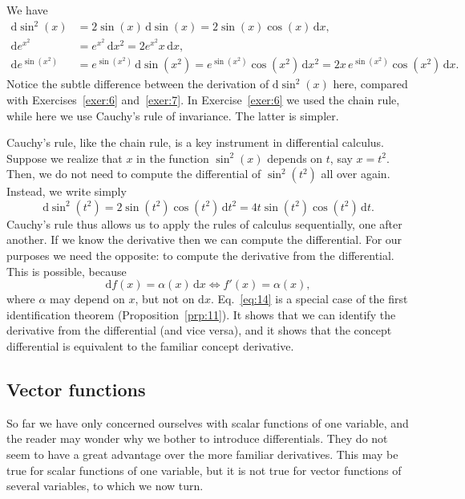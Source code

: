 \documentclass[12pt,a4paper]{article}
\makeatletter
\theoremstyle{definition}
\renewenvironment{proof}[1][\proofname]{\par
  \pushQED{\qed}%
  \normalfont \topsep6\p@\@plus6\p@\relax
  \trivlist
  \item[\hskip\labelsep\bfseries #1\@addpunct{.}]\ignorespaces
}{%
  \popQED\endtrivlist\@endpefalse
}
\newenvironment{solution}{%
  \begin{proof}[Solution]%
}{%
  \end{proof}%
}
\newcommand{\dd}{\mathrm{d}}
\makeatother
\begin{document}
\begin{solution}
We have
\begin{align*}
\dd\sin^2(x) &= 2\sin(x)\, \dd\sin(x) = 2\sin(x)\cos(x)\, \dd x, \\
\dd e^{x^2} &= e^{x^2}\, \dd x^2 = 2e^{x^2} x\, \dd x, \\
\dd e^{\sin(x^2)} &= e^{\sin(x^2)}\, \dd\sin(x^2) = e^{\sin(x^2)} \cos(x^2)\, \dd x^2
= 2x\, e^{\sin(x^2)} \cos(x^2)\, \dd x.
\end{align*}
Notice the subtle difference between the derivation of $\dd\sin^2(x)$ here, compared with Exercises~\ref{exer:6} and~\ref{exer:7}. In Exercise~\ref{exer:6} we used the chain rule, while here we use Cauchy's rule of invariance. The latter is simpler. %
\end{solution}

Cauchy's rule, like the chain rule, is a key instrument in differential calculus. Suppose we realize that $x$ in the function $\sin^2(x)$ depends on $t$, say $x = t^2$. Then, we do not need to compute the differential of $\sin^2(t^2)$ all over again. Instead, we write simply
\[
\dd\sin^2(t^2) = 2\sin(t^2)\cos(t^2)\, \dd t^2 = 4t\sin(t^2)\cos(t^2)\, \dd t.
\]
Cauchy's rule thus allows us to apply the rules of calculus sequentially, one after another. If we know the derivative then we can compute the differential. For our purposes we need the opposite: to compute the derivative from the differential. This is possible, because
\begin{equation}\label{eq:14}
\dd f(x) = \alpha(x)\, \dd x \iff f'(x) = \alpha(x),
\end{equation}
where $\alpha$ may depend on $x$, but not on $\dd x$. %
Eq.~\eqref{eq:14} is a special case of the first identification theorem (Proposition~\ref{prp:11}). It shows that we can identify the derivative from the differential (and vice versa), and it shows that the concept differential is equivalent to the familiar concept derivative. %

\subsection{Vector functions}\label{sec:4.3}

So far we have only concerned ourselves with scalar functions of one variable, and the reader may wonder why we bother to introduce differentials. They do not seem to have a great advantage over the more familiar derivatives. This may be true for scalar functions of one variable, but it is not true for vector functions of several variables, to which we now turn. %
\end{document}
